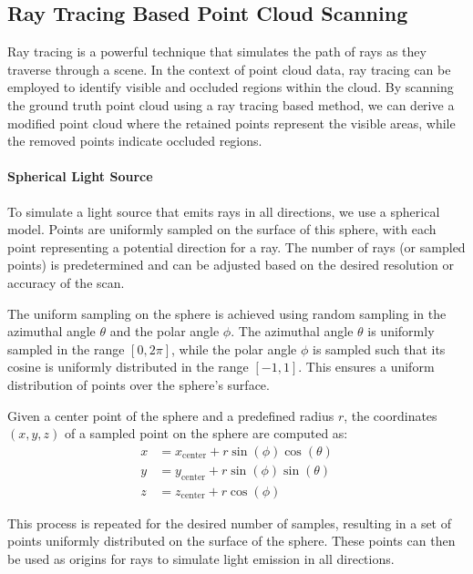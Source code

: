 \documentclass[11pt, a4paper,oneside,chapterprefix=false]{scrbook}
\begin{document}
\subsection{Ray Tracing Based Point Cloud Scanning} \label{sec:ray tracing point cloud scanning}

Ray tracing is a powerful technique that simulates the path of rays as they traverse through a scene. In the context of point cloud data, ray tracing can be employed to identify visible and occluded regions within the cloud. By scanning the ground truth point cloud using a ray tracing based method, we can derive a modified point cloud where the retained points represent the visible areas, while the removed points indicate occluded regions.

\paragraph{Spherical Light Source}

To simulate a light source that emits rays in all directions, we use a spherical model. Points are uniformly sampled on the surface of this sphere, with each point representing a potential direction for a ray. The number of rays (or sampled points) is predetermined and can be adjusted based on the desired resolution or accuracy of the scan.

\vspace{10pt}

The uniform sampling on the sphere is achieved using random sampling in the azimuthal angle \( \theta \) and the polar angle \( \phi \). The azimuthal angle \( \theta \) is uniformly sampled in the range \([0, 2\pi]\), while the polar angle \( \phi \) is sampled such that its cosine is uniformly distributed in the range \([-1, 1]\). This ensures a uniform distribution of points over the sphere's surface.

\vspace{10pt}

Given a center point of the sphere and a predefined radius \( r \), the coordinates \( (x, y, z) \) of a sampled point on the sphere are computed as:
\begin{align*}
    x &= x_{\text{center}} + r \sin(\phi) \cos(\theta) \\
    y &= y_{\text{center}} + r \sin(\phi) \sin(\theta) \\
    z &= z_{\text{center}} + r \cos(\phi)
\end{align*}

This process is repeated for the desired number of samples, resulting in a set of points uniformly distributed on the surface of the sphere. These points can then be used as origins for rays to simulate light emission in all directions.
\end{document}
